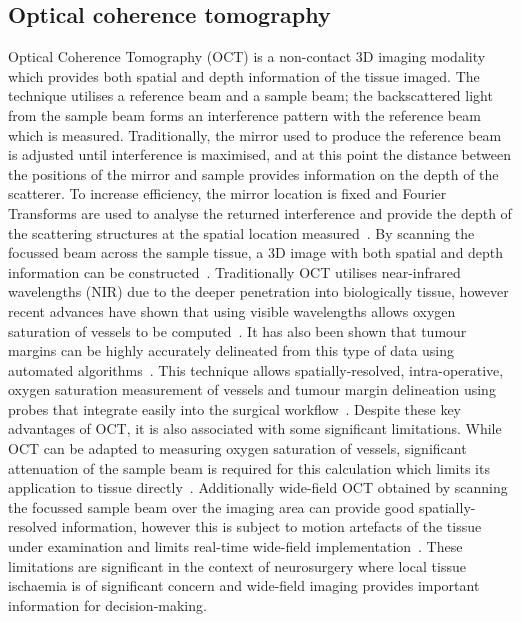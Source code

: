 \subsection{Optical coherence tomography}
Optical Coherence Tomography (OCT) is a non-contact 3D imaging modality which provides both spatial and depth information of the tissue imaged. The technique utilises a reference beam and a sample beam; the backscattered light from the sample beam forms an interference pattern with the reference beam which is measured. Traditionally, the mirror used to produce the reference beam is adjusted until interference is maximised, and at this point the distance between the positions of the mirror and sample provides information on the depth of the scatterer. To increase efficiency, the mirror location is fixed and Fourier Transforms are used to analyse the returned interference and provide the depth of the scattering structures at the spatial location measured~\cite{Fercher2003}. By scanning the focussed beam across the sample tissue, a 3D image with both spatial and depth information can be constructed~\cite{Fercher2003}. Traditionally OCT utilises near-infrared wavelengths (NIR) due to the deeper penetration into biologically tissue, however recent advances have shown that using visible wavelengths allows oxygen saturation of vessels to be computed~\cite{Shu2017}. It has also been shown that tumour margins can be highly accurately delineated from this type of data using automated algorithms~\cite{Sunny2019}. 
This technique allows spatially-resolved, intra-operative, oxygen saturation measurement of vessels and tumour margin delineation using probes that integrate easily into the surgical workflow~\cite{Jansen2018}. Despite these key advantages of OCT, it is also associated with some significant limitations. While OCT can be adapted to measuring oxygen saturation of vessels, significant attenuation of the sample beam is required for this calculation which limits its application to tissue directly~\cite{Shu2017}. Additionally wide-field OCT obtained by scanning the focussed sample beam over the imaging area can provide good spatially-resolved information, however this is subject to motion artefacts of the tissue under examination and limits real-time wide-field implementation~\cite{Yu2015}. These limitations are significant in the context of neurosurgery where local tissue ischaemia is of significant concern and wide-field imaging provides important information for decision-making. 

